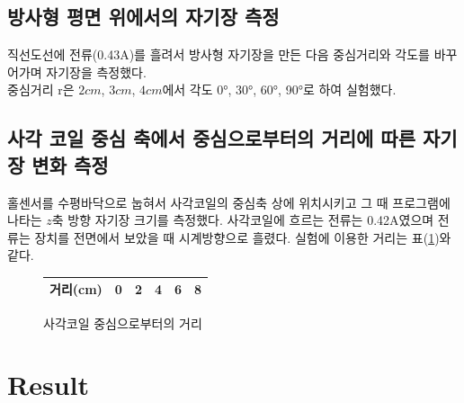 \documentclass[a4paper]{article}
\begin{document}
	\subsection{방사형 평면 위에서의 자기장 측정}
		직선도선에 전류(0.43\si{A})를 흘려서 방사형 자기장을 만든 다음 중심거리와 각도를 바꾸어가며 자기장을 측정했다. \\
		중심거리 r은 $2\si{cm}$, $3\si{cm}$, $4\si{cm}$에서 각도 \ang{0}, \ang{30}, \ang{60}, \ang{90}로 하여 실험했다.

	\subsection{사각 코일 중심 축에서 중심으로부터의 거리에 따른 자기장 변화 측정}
		홀센서를 수평바닥으로 눕혀서 사각코일의 중심축 상에 위치시키고 그 때 프로그램에 나타는 $z$축 방향 자기장 크기를 측정했다.
		사각코일에 흐르는 전류는 0.42\si{A}였으며 전류는 장치를 전면에서 보았을 때 시계방향으로 흘렸다.
		실험에 이용한 거리는 표(\ref{tab:sagak})와 같다.
		\begin{figure}[h]
			\centering
			\begin{tabular}{c|ccccc}
				\hline \hline
				거리(\si{cm}) & 0 & 2 & 4 & 6 & 8 \\
				\hline \hline
			\end{tabular}
			\caption{사각코일 중심으로부터의 거리}
			\label{tab:sagak}
		\end{figure}

\section{Result}
\end{document}
